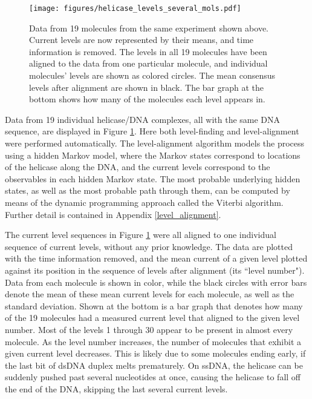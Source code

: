 \begin{figure}[h]
\begin{centering}
\texttt{[image: figures/helicase\_levels\_several\_mols.pdf]}
\caption[Current levels are reproducible molecule to molecule]{Data from 19 molecules from the same experiment shown above.  Current levels are now represented by their means, and time information is removed.  The levels in all 19 molecules have been aligned to the data from one particular molecule, and individual molecules' levels are shown as colored circles.  The mean consensus levels after alignment are shown in black.  The bar graph at the bottom shows how many of the molecules each level appears in.}
\label{fig:helicase_data_aligned}
\end{centering}
\end{figure}

Data from \num{19} individual helicase/DNA complexes, all with the same DNA sequence, are displayed in Figure \ref{fig:helicase_data_aligned}.  Here both level-finding and level-alignment were performed automatically.  The level-alignment algorithm models the process using a hidden Markov model, where the Markov states correspond to locations of the helicase along the DNA, and the current levels correspond to the observables in each hidden Markov state.  The most probable underlying hidden states, as well as the most probable path through them, can be computed by means of the dynamic programming approach called the Viterbi algorithm.  Further detail is contained in Appendix \ref{level_alignment}.

The current level sequences in Figure \ref{fig:helicase_data_aligned} were all aligned to one individual sequence of current levels, without any prior knowledge.  The data are plotted with the time information removed, and the mean current of a given level plotted against its position in the sequence of levels after alignment (its ``level number").  Data from each molecule is shown in color, while the black circles with error bars denote the mean of these mean current levels for each molecule, as well as the standard deviation.  Shown at the bottom is a bar graph that denotes how many of the \num{19} molecules had a measured current level that aligned to the given level number.  Most of the levels \num{1} through \num{30} appear to be present in almost every molecule.  As the level number increases, the number of molecules that exhibit a given current level decreases.  This is likely due to some molecules ending early, if the last bit of dsDNA duplex melts prematurely.  On ssDNA, the helicase can be suddenly pushed past several nucleotides at once, causing the helicase to fall off the end of the DNA, skipping the last several current levels.

